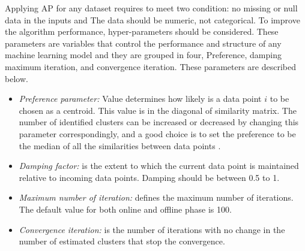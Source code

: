 \documentclass[../UNBThesis2.tex]{subfiles}
\begin{document}

Applying AP for any dataset requires to meet two condition: no missing or null data in the inputs and The data should be numeric, not categorical.
To improve the algorithm performance, hyper-parameters should be considered. These parameters are variables that control the performance and structure of any machine learning model and they are grouped in four, Preference, damping maximum iteration, and convergence iteration. These parameters are described below.
\begin{itemize}
    \item\textit{Preference parameter:}  Value determines how likely is a data point $i$ to be chosen as a centroid. This value is in the diagonal of similarity matrix. The number of identified clusters can be increased or decreased by changing this parameter correspondingly, and a good choice is to set the preference to be the median of all the similarities between data points \cite{li2012improved}.
    \item\textit{Damping factor:}  is the extent to which the current data point is maintained relative to incoming data points. Damping should be between 0.5 to 1. 
    \item\textit{Maximum number of iteration:}  defines the maximum number of iterations. The default value for both online and offline phase is 100.
    \item\textit{Convergence iteration:}  is the number of iterations with no change in the number of estimated clusters that stop the convergence.
\end{itemize}
\end{document}
